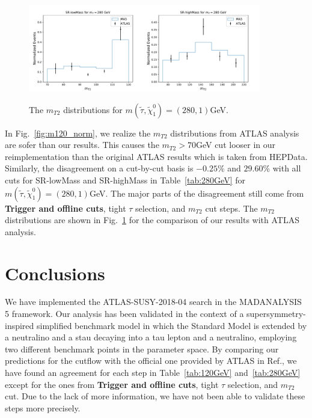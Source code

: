 \documentclass{ws-mpla}
\begin{document}
\begin{figure}[t]
  \centerline{\includegraphics[width=2.0in]{m280_norm_1}\includegraphics[width=2.0in]{m280_norm_2}}
  \vspace*{8pt}
  \caption{The $m_{T2}$ distributions for $m(\tilde{\tau},\tilde{\chi}^0_1)=(280,1) $GeV.\protect\label{fig:m280_norm}}
\end{figure}
In Fig.~\ref{fig:m120_norm}, we realize the $m_{T2}$ distributions from ATLAS analysis are sofer than our results. This causes the $m_{T2} > 70$GeV cut looser in our reimplementation than the original ATLAS results which is taken from HEPData\cite{hepdata}.
Similarly, the disagreement on a cut-by-cut basis is $-0.25\%$ and $29.60\%$ with all cuts for SR-lowMass and SR-highMass in Table~\ref{tab:280GeV} for $m(\tilde{\tau},\tilde{\chi}^0_1)=(280,1) $GeV. The major parts of the disagreement still come from  \textbf{Trigger and offline cuts}, tight $\tau$ selection, and $m_{T2}$ cut steps. 
The $m_{T2}$ distributions are shown in Fig.~\ref{fig:m280_norm} for the comparison of our results with ATLAS analysis. 


\section{Conclusions}

We have implemented the ATLAS-SUSY-2018-04 search in the MADANALYSIS 5 framework. Our analysis has been validated in the context of a supersymmetry-inspired simplified benchmark model in which the Standard Model is extended by a neutralino and a stau decaying into a tau lepton and a neutralino, employing two different benchmark points in the parameter space.
By comparing our predictions for the cutflow with the official one provided by ATLAS in Ref.\cite{Aad:2019byo}, we have found an agreement for each step in Table~\ref{tab:120GeV} and~\ref{tab:280GeV} except for the ones from \textbf{Trigger and offline cuts}, tight $\tau$ selection, and $m_{T2}$ cut. Due to the lack of more information, we have not been able to validate these steps more precisely. 
\end{document}
